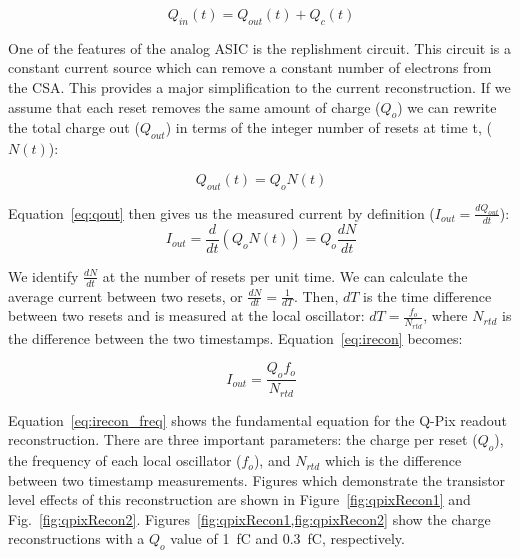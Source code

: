 \begin{equation}~\label{eq:qin}
Q_{in}(t) = Q_{out}(t) + Q_{c}(t)
\end{equation}

One of the features of the analog ASIC is the replishment circuit.
This circuit is a constant current source which can remove a constant number of electrons from the CSA.
This provides a major simplification to the current reconstruction.
If we assume that each reset removes the same amount of charge ($Q_{o}$) we can rewrite the total charge out ($Q_{out}$) in terms of the integer number of resets at time t, ($N(t)$):

\begin{equation}~\label{eq:qout}
Q_{out}(t) = Q_{o} N(t)
\end{equation}

Equation~\ref{eq:qout} then gives us the measured current by definition ($I_{out} = \frac{dQ_{out}}{dt}$):
\begin{equation}~\label{eq:irecon}
I_{out} = \frac{d}{dt}(Q_{o}N(t)) = Q_{o}\frac{dN}{dt}
\end{equation}

We identify $\frac{dN}{dt}$ at the number of resets per unit time.
We can calculate the average current between two resets, or $\frac{dN}{dt} = \frac{1}{dT}$.
Then, $dT$ is the time difference between two resets and is measured at the local oscillator: $dT = \frac{f_{o}}{N_{rtd}}$, where $N_{rtd}$ is the difference between the two timestamps.
Equation~\ref{eq:irecon} becomes:

\begin{equation}~\label{eq:irecon_freq}
\boxed{I_{out} = \frac{Q_{o}f_{o}}{N_{rtd}}}
\end{equation}

Equation~\ref{eq:irecon_freq} shows the fundamental equation for the Q-Pix readout reconstruction.
There are three important parameters: the charge per reset ($Q_{o}$), the frequency of each local oscillator ($f_{o}$), and $N_{rtd}$ which is the difference between two timestamp measurements.
Figures which demonstrate the transistor level effects of this reconstruction are shown in Figure~\ref{fig:qpixRecon1} and Fig.~\ref{fig:qpixRecon2}.
Figures~\cref{fig:qpixRecon1,fig:qpixRecon2} show the charge reconstructions with a $Q_{o}$ value of 1~\unit{fC} and 0.3~\unit{fC}, respectively.

